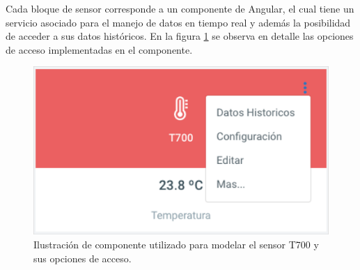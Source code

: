 Cada bloque de sensor corresponde a un componente de Angular, el cual tiene un servicio asociado para el manejo de datos en tiempo real y además la posibilidad de acceder a sus datos históricos. En la figura \ref{fig:sensor-temp} se observa en detalle las opciones de acceso implementadas en el componente.
\pagebreak
 \begin{figure}[htpb]
	\centering
	\includegraphics[scale=.60]{./Figures/sensor-temp.png}
	\caption[Sensor de temperatura T700]{Ilustración de componente utilizado para modelar el sensor T700 y sus opciones de acceso.}
	\label{fig:sensor-temp}
\end{figure}


